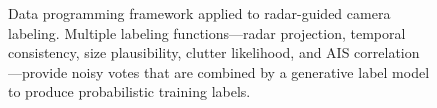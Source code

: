 \begin{figure}[t]
	\caption{Data programming framework applied to radar-guided camera labeling. Multiple labeling functions---radar projection, temporal consistency, size plausibility, clutter likelihood, and AIS correlation---provide noisy votes that are combined by a generative label model to produce probabilistic training labels.}
	\label{fig:data_programming}
\end{figure}

